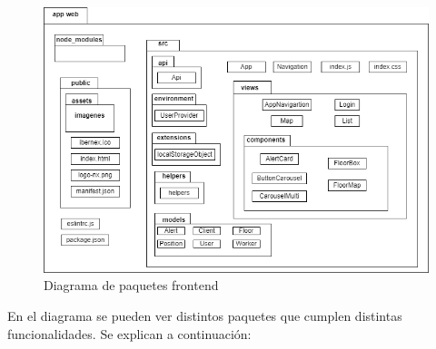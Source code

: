 \begin{figure}[!h]
    \centering
    \includegraphics[width=15cm]{Imagenes/Diagrama-paquetes-frontend}
    \caption{Diagrama de paquetes frontend}
    \label{fig:paquetes-frontend}
\end{figure}


En el diagrama se pueden ver distintos paquetes que cumplen distintas funcionalidades. Se explican a continuación:

